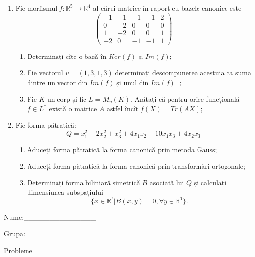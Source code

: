 \documentclass{article}
\begin{document}
\begin{enumerate}
 \item Fie morfismul $f:\mathbb{R}^5 \to \mathbb{R}^4$ al cărui matrice în raport cu bazele canonice este
$$\begin{pmatrix}
-1&-1&-1&-1&2\\
0&-2&0&0&0\\
1&-2&0&0&1\\
-2&0&-1&-1&1
\end{pmatrix}$$

\begin{enumerate}
\item Determinați cîte o bază în $Ker(f)$ și $Im(f)$;
\item Fie vectorul $v=(1,3,1,3)$ determinați descompunerea acestuia ca suma dintre un vector din $Im(f)$ și unul din $Im(f)^\perp$;
\item Fie $K$ un corp și fie $L=M_n(K)$. Arătați că pentru orice funcțională $f \in L^*$ există o matrice $A$ astfel încît $f(X)=Tr(AX)$;
\end{enumerate}
\item Fie forma pătratică:
$$Q= x_1^2-2x_2^2+x_3^2+4x_1x_2-10x_1x_3+4x_2x_3$$

\begin{enumerate}
\item Aduceți forma pătratică la forma canonică prin metoda Gauss;
\item Aduceți forma pătratică la forma canonică prin transformări ortogonale;
\item Determinați forma biliniară simetrică $B$ asociată lui $Q$ și calculați dimensiunea subspațiului
$$\{x \in \mathbb{R}^3 | B(x,y)=0,\forall y \in \mathbb{R}^3\}.$$

\end{enumerate}
\end{enumerate}
\newpage
\begin{flushright}
Nume:\_\_\_\_\_\_\_\_\_\_\_\_\_\_
 
 
Grupa:\_\_\_\_\_\_\_\_\_\_\_\_\_\_
\end{flushright}
\begin{center}
\vspace{2cm}
{\Large Probleme}
\vspace{2cm}
\end{center}
\end{document}
